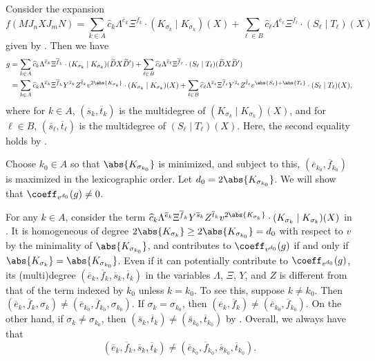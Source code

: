 \documentclass[letterpaper, 11pt]{amsart}
\begin{document}
\begin{pf}
Consider the expansion
\[
        f(M J_n X J_m N) = \sum_{k \in A} \widehat{c}_{k} \Lambda^{\overline{e}_k}\Xi^{\overline{f}_k}\cdot (K_{\sigma_k}\mid K_{\sigma_k})(X) + \sum_{\ell \in B} \widehat{c}_{\ell} \Lambda^{\overline{e}_\ell}\Xi^{\overline{f}_\ell}\cdot (S_\ell\mid T_\ell)(X)
\]
given by .
Then we have
\begin{equation}\label{eq:expansion-g}
\begin{aligned}
        g &= \sum_{k \in A} \widehat{c}_{k} \Lambda^{\overline{e}_k}\Xi^{\overline{f}_k}\cdot (K_{\sigma_k}\mid K_{\sigma_k})(\widetilde{D}X\widetilde{D}') + \sum_{\ell \in B} \widehat{c}_{\ell} \Lambda^{\overline{e}_\ell}\Xi^{\overline{f}_\ell}\cdot (S_\ell\mid T_\ell)(\widetilde{D}X\widetilde{D}')\\
        &=\sum_{k \in A} \widehat{c}_{k} \Lambda^{\overline{e}_k}\Xi^{\overline{f}_k}Y^{\overline{s}_k}Z^{\overline{t}_k}v^{2\abs{K_{\sigma_k}}}\cdot (K_{\sigma_k}\mid K_{\sigma_k})(X) + \sum_{\ell \in B} \widehat{c}_{\ell} \Lambda^{\overline{e}_\ell}\Xi^{\overline{f}_\ell}Y^{\overline{s}_\ell}Z^{\overline{t}_\ell}v^{\abs{S_\ell} + \abs{T_\ell}} \cdot (S_\ell\mid T_\ell)(X),
\end{aligned}
\end{equation}
where for $k\in A$, $(\overline{s}_k,\overline{t}_k)$ is the multidegree of $(K_{\sigma_k}\mid K_{\sigma_k})(X)$, and for $\ell \in B$, $(\overline{s}_\ell,\overline{t}_\ell)$ is the multidegree of $(S_\ell\mid T_\ell)(X)$.
Here, the second equality holds by .

Choose $k_0 \in A$ so that $\abs{K_{\sigma_{k_0}}}$ is minimized, and subject to this, $(\overline{e}_{k_0}, \overline{f}_{k_0})$ is maximized in the lexicographic order.
Let $d_0 = 2 \abs{K_{\sigma_{k_0}}}$.
We will show that $\coeff_{v^{d_0}}(g)\neq 0$.

For any $k\in A$, consider the term $\widehat{c}_{k} \Lambda^{\overline{e}_k}\Xi^{\overline{f}_k}Y^{\overline{s}_k}Z^{\overline{t}_k}v^{2\abs{K_{\sigma_k}}}\cdot (K_{\sigma_k}\mid K_{\sigma_k})(X)$ in .
It is homogeneous of degree $2 \abs{K_{\sigma_k}} \geq 2 \abs{K_{\sigma_{k_0}}} = d_0$ with respect to $v$ by the minimality of $\abs{K_{\sigma_{k_0}}}$, and contributes to $\coeff_{v^{d_0}}(g)$ if and only if $\abs{K_{\sigma_k}} = \abs{K_{\sigma_{k_0}}}$.
Even if it can potentially contribute to $\coeff_{v^{d_0}}(g)$, its (multi)degree $(\overline{e}_k,\overline{f}_k,\overline{s}_k,\overline{t}_k)$ in the variables $\Lambda$, $\Xi$, $Y$, and $Z$ is different from that of the term indexed by $k_0$ unless $k=k_0$.
To see this, suppose $k\neq k_0$.
Then $(\overline{e}_k,\overline{f}_k,\sigma_k)\neq (\overline{e}_{k_0},\overline{f}_{k_0},\sigma_{k_0})$.
If $\sigma_k=\sigma_{k_0}$, then $(\overline{e}_k,\overline{f}_k)\neq (\overline{e}_{k_0},\overline{f}_{k_0})$.
On the other hand, if $\sigma_k\neq \sigma_{k_0}$, then $(\overline{s}_k,\overline{t}_k)\neq (\overline{s}_{k_0},\overline{t}_{k_0})$ by .
Overall, we always have that 
\[
    (\overline{e}_k,\overline{f}_k,\overline{s}_k,\overline{t}_k)\neq (\overline{e}_{k_0},\overline{f}_{k_0},\overline{s}_{k_0},\overline{t}_{k_0}).
\]


\end{pf}
\end{document}
